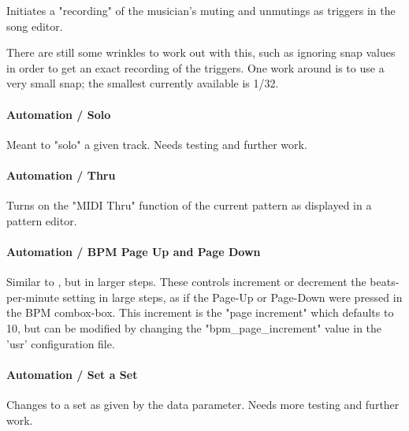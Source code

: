   Initiates a "recording" of the musician's muting and unmutings as triggers
   in the song editor.

   There are still some wrinkles to work out with this, such as ignoring snap
   values in order to get an exact recording of the triggers.
   One work around is to use a very small snap; the smallest currently
   available is 1/32.

\paragraph{Automation / Solo}
\label{paragraph:configuration_midi_ctrl_solo}

   Meant to "solo" a given track.
   Needs testing and further work.

\paragraph{Automation / Thru}
\label{paragraph:configuration_midi_ctrl_thru}

   Turns on the "MIDI Thru" function of the current pattern as displayed in a
   pattern editor.

\paragraph{Automation / BPM Page Up and Page Down}
\label{paragraph:configuration_midi_ctrl_bpmpageupdn}

   Similar to
   , but in
   larger steps.
   These controls increment or decrement the beats-per-minute setting
   in large steps, as if
   the Page-Up or Page-Down were pressed in the BPM combox-box.
   This increment is the
   "page increment" which defaults to 10, but can be modified by
   changing the "bpm\_page\_increment" value in the 'usr'
   configuration file.

\paragraph{Automation / Set a Set}
\label{paragraph:configuration_midi_set_a_set}

   Changes to a set as given by the data parameter.
   Needs more testing and further work.


